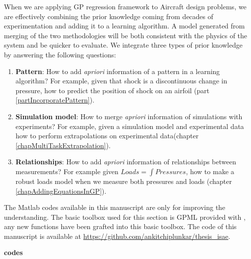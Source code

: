 When we are applying GP regression framework to Aircraft design problems, we are effectively combining the prior knowledge coming from decades of experimentation and adding it to a learning algorithm. A model generated from merging of the two methodologies will be both consistent with the physics of the system and be quicker to evaluate. We integrate three types of prior knowledge by answering the following questions:

\begin{enumerate}
\item \textbf{Pattern}: How to add \textit{apriori} information of a pattern in a learning algorithm? For example, given that shock is a discontinuous change in pressure, how to predict the position of shock on an airfoil (part \ref{partIncorporatePattern}). 
\item \textbf{Simulation model}: How to merge \textit{apriori} information of simulations with experiments? For example, given a simulation model and experimental data how to perform extrapolations on experimental data(chapter \ref{chapMultiTaskExtrapolation}). 
\item \textbf{Relationships}: How to add \textit{apriori} information of relationships between measurements? For example given $Loads = \int Pressures$, how to make a robust loads model when we measure both pressures and loads (chapter \ref{chapAddingEquationsInGP}).
\end{enumerate}

The Matlab codes available in this manuscript are only for improving the understanding. The basic toolbox used for this section is GPML provided with \cite{Rasmussen2005}, any new functions have been grafted into this basic toolbox. The code of this manuscript is available at \url{https://github.com/ankitchiplunkar/thesis_isae}. 




\textbf{codes}
